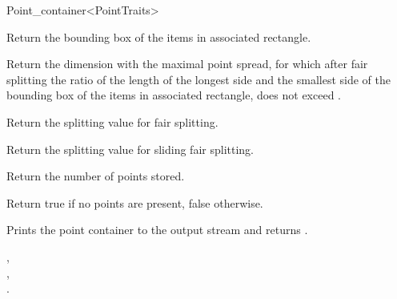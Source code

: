 \begin{ccRefClass}{Point_container<PointTraits>}
\begin{ccAdvanced}
{Return the bounding box of the items in associated rectangle.}

{Return the dimension with the maximal point spread, for which after fair splitting
the ratio of the length of the longest side and the smallest side of the bounding box of
the items in associated rectangle,
does not exceed .}

{Return the splitting value for fair splitting.}

{Return the splitting value for sliding fair splitting.}

{
Return the number of points stored.
}

{
Return true if no points are present, false otherwise.
}





{Prints the point container  to the output stream  and returns .}


\ccSeeAlso

,\\
,\\
.

\end{ccAdvanced}
\end{ccRefClass}


